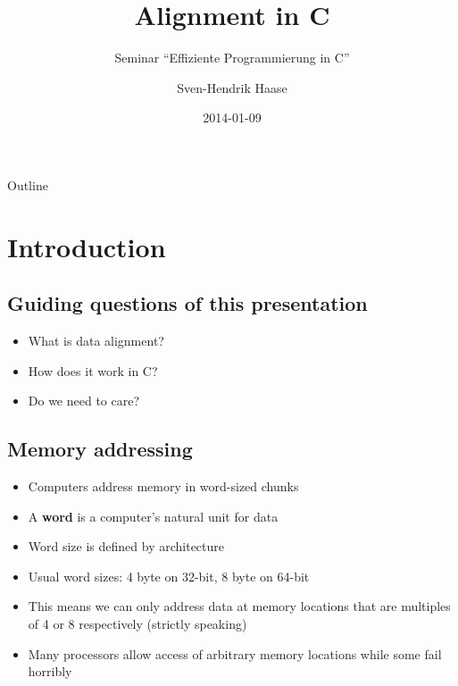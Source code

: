 \documentclass{beamer}
\begin{document}
\title{Alignment in C}
\subtitle{Seminar ``Effiziente Programmierung in C''}
\date{2014-01-09}
\author{Sven-Hendrik Haase}

\begin{frame}
    \titlepage
\end{frame}

\begin{frame}{Outline}
    \tableofcontents
\end{frame}

\section{Introduction}
\subsection{Guiding questions of this presentation}
\begin{frame}{\insertsection}{\insertsubsection}
	\begin{itemize}
		\item What is data alignment?\pause
        \item How does it work in C?\pause
        \item Do we need to care?
	\end{itemize}
\end{frame}

\subsection{Memory addressing}
\begin{frame}{\insertsection}{\insertsubsection}
	\begin{itemize}
		\item Computers address memory in word-sized chunks
		\item A \textbf{word} is a computer's natural unit for data
		\item Word size is defined by architecture
		\item Usual word sizes: 4 byte on 32-bit, 8 byte on 64-bit
		\item This means we can only address data at memory locations that are
			  multiples of 4 or 8 respectively (strictly speaking)
        \item Many processors allow access of arbitrary memory locations while some fail
            horribly
	\end{itemize}
\end{frame}
\end{document}
